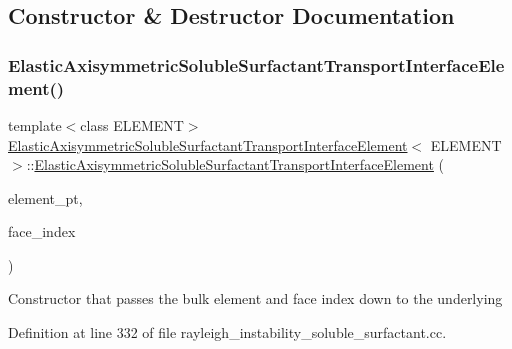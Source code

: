 \subsection{Constructor \& Destructor Documentation}
\mbox{\label{classElasticAxisymmetricSolubleSurfactantTransportInterfaceElement_a0df5772b5f387b69601c892feb4f6da7}} 
\subsubsection{\texorpdfstring{Elastic\+Axisymmetric\+Soluble\+Surfactant\+Transport\+Interface\+Element()}{ElasticAxisymmetricSolubleSurfactantTransportInterfaceElement()}}
{\footnotesize\ttfamily template$<$class E\+L\+E\+M\+E\+NT$>$ \\
\hyperlink{classElasticAxisymmetricSolubleSurfactantTransportInterfaceElement}{Elastic\+Axisymmetric\+Soluble\+Surfactant\+Transport\+Interface\+Element}$<$ E\+L\+E\+M\+E\+NT $>$\+::\hyperlink{classElasticAxisymmetricSolubleSurfactantTransportInterfaceElement}{Elastic\+Axisymmetric\+Soluble\+Surfactant\+Transport\+Interface\+Element} (\begin{DoxyParamCaption}\item[{Finite\+Element $\ast$const \&}]{element\+\_\+pt,  }\item[{const int \&}]{face\+\_\+index }\end{DoxyParamCaption})\hspace{0.3cm}{\ttfamily [inline]}}

Constructor that passes the bulk element and face index down to the underlying 

Definition at line 332 of file rayleigh\+\_\+instability\+\_\+soluble\+\_\+surfactant.\+cc.



